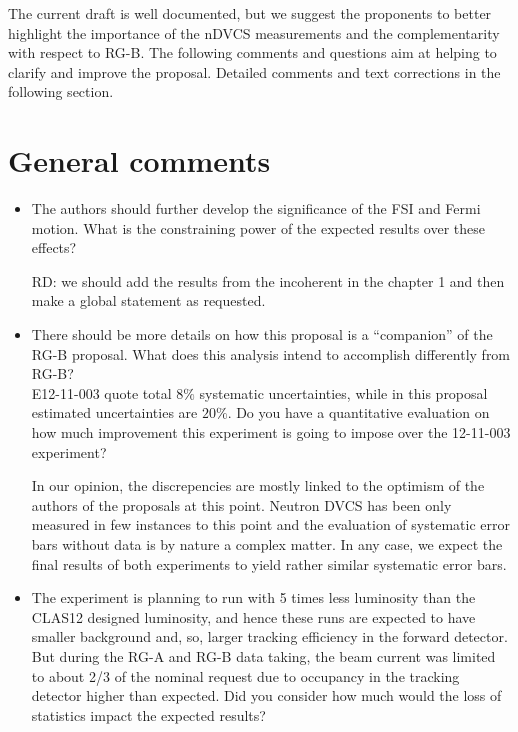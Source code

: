 The current draft is well documented, but we suggest the proponents to better 
highlight the importance of the nDVCS measurements and the complementarity with 
respect to RG-B.
The following comments and questions aim at helping to clarify and improve the 
proposal. Detailed comments and text corrections in the following section.
 
 
 \section*{General comments}
 
  \begin{itemize}
  
 \item The authors should further develop the significance of the FSI and Fermi motion. What is the constraining power of the expected results over these effects?

{\color{red} RD: we should add the results from the incoherent in the chapter 1 and then make a global statement as requested. }

\item There should be more details  on how this   proposal is a ``companion'' of the RG-B proposal. What does this analysis intend to accomplish differently from RG-B? 
\\ E12-11-003 quote total $8\%$ systematic uncertainties, while in this proposal estimated uncertainties are $20\%$. Do you have a quantitative evaluation on how much improvement this experiment is going to impose over the 12-11-003 experiment?

{\color{red} In our opinion, the discrepencies are mostly linked to the optimism of the authors of the proposals at this
point. Neutron DVCS has been only measured in few instances to this point and the evaluation of systematic 
error bars without data is by nature a complex matter. In any case, we expect the final results of both 
experiments to yield rather similar systematic error bars.}
 
 \item The experiment is planning to run with 5 times less luminosity than the CLAS12 designed luminosity, and hence these runs are expected to have smaller background and, so, larger tracking efficiency in the forward detector. \\
 But during the RG-A and RG-B data taking, the beam current was limited to about 2/3 of the nominal request due to occupancy in the tracking detector higher than expected. Did you consider how much would the loss of statistics impact the expected results? 
 

\end{itemize}
